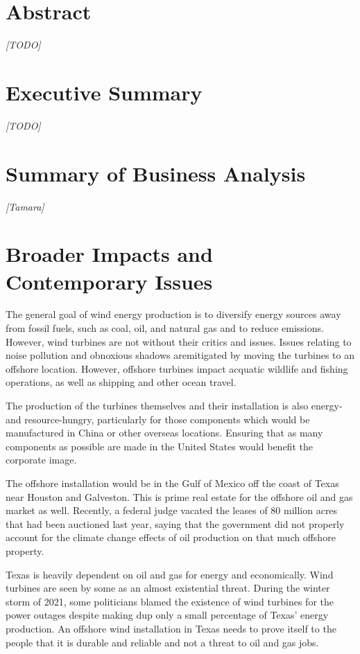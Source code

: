 \documentclass[11pt,letterpaper,conference]{IEEEtran}
\begin{document}
\onecolumn
\tableofcontents
\thispagestyle{plain}
\pagestyle{plain}
\clearpage

\twocolumn
\section{Abstract}

\emph{[TODO]}

\section{Executive Summary}

\emph{[TODO]}

\section{Summary of Business Analysis}

\emph{[Tamara]}

\section{Broader Impacts and Contemporary Issues}

The general goal of wind energy production is to diversify energy sources away
from fossil fuels, such as coal, oil, and natural gas and to reduce emissions.
However, wind turbines are not without their critics and issues. Issues relating to noise pollution and obnoxious shadows aremitigated by moving the turbines to an offshore location. However, offshore turbines impact acquatic wildlife and fishing operations, as well as shipping and other ocean travel.

The production of the turbines themselves and their installation is also energy- and resource-hungry, particularly for those components which would be
manufactured in China or other overseas locations. Ensuring that as many components as possible are made in the United States would benefit the corporate image.

The offshore installation would be in the Gulf of Mexico off the coast
of Texas near Houston and Galveston. This is prime real estate for the offshore
oil and gas market as well. Recently, a federal judge vacated the leases of
80 million acres that had been auctioned last year, saying that the government
did not properly account for the climate change effects of oil production on
that much offshore property\cite{court}.

Texas is heavily dependent on oil and gas for energy and economically. Wind turbines are seen by some as an almost existential threat. During the winter storm of 2021, some politicians blamed the existence of wind turbines for the power outages despite making dup only a small percentage of Texas' energy production\cite{storm}. An offshore wind installation in Texas needs to prove itself to the people that it is durable and reliable and not a threat to oil and gas jobs.
\end{document}
